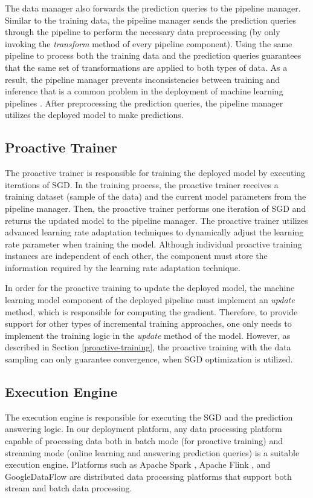 The data manager also forwards the prediction queries to the pipeline manager.
Similar to the training data, the pipeline manager sends the prediction queries through the pipeline to perform the necessary data preprocessing (by only invoking the \textit{transform} method of every pipeline component).
Using the same pipeline to process both the training data and the prediction queries guarantees that the same set of transformations are applied to both types of data.
As a result, the pipeline manager prevents inconsistencies between training and inference that is a common problem in the deployment of machine learning pipelines \cite{baylor2017tfx}.
After preprocessing the prediction queries, the pipeline manager utilizes the deployed model to make predictions.

\subsection{Proactive Trainer} 
The proactive trainer is responsible for training the deployed model by executing iterations of SGD.
In the training process, the proactive trainer receives a training dataset (sample of the data) and the current model parameters from the pipeline manager.
Then, the proactive trainer performs one iteration of SGD and returns the updated model to the pipeline manager.
The proactive trainer utilizes advanced learning rate adaptation techniques to dynamically adjust the learning rate parameter when training the model.
Although individual proactive training instances are independent of each other, the component must store the information required by the learning rate adaptation technique.

In order for the proactive training to update the deployed model, the machine learning model component of the deployed pipeline must implement an \textit{update} method, which is responsible for computing the gradient.
Therefore, to provide support for other types of incremental training approaches, one only needs to implement the training logic in the \textit{update} method of the model.
However, as described in Section \ref{proactive-training}, the proactive training with the data sampling can only guarantee convergence, when SGD optimization is utilized.


\subsection{Execution Engine}
The execution engine is responsible for executing the SGD and the prediction answering logic.
In our deployment platform, any data processing platform capable of processing data both in batch mode (for proactive training) and streaming mode (online learning and answering prediction queries) is a suitable execution engine.
Platforms such as Apache Spark \cite{zaharia2010spark}, Apache Flink \cite{carbone2015apache}, and GoogleDataFlow \cite{akidau2015dataflow} are distributed data processing platforms that support both stream and batch data processing.